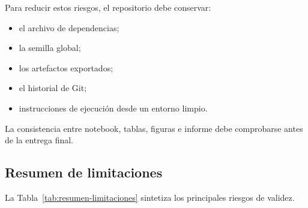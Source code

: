 Para reducir estos riesgos, el repositorio debe conservar:

\begin{itemize}
    \item el archivo de dependencias;

    \item la semilla global;

    \item los artefactos exportados;

    \item el historial de Git;

    \item instrucciones de ejecución desde un entorno limpio.
\end{itemize}

La consistencia entre notebook, tablas, figuras e informe debe comprobarse
antes de la entrega final.

\subsection{Resumen de limitaciones}

La Tabla~\ref{tab:resumen-limitaciones} sintetiza los principales riesgos
de validez.

